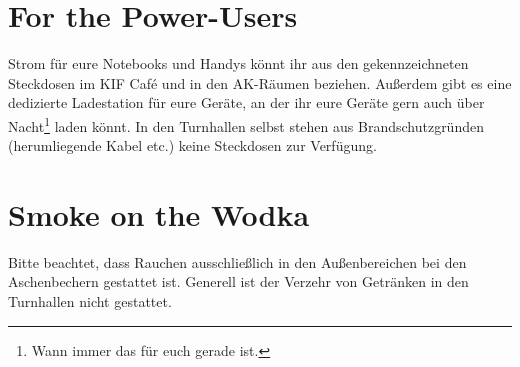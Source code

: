 \section*{For the Power-Users}

Strom für eure Notebooks und Handys könnt ihr aus den gekennzeichneten Steckdosen im KIF Café und in den AK-Räumen beziehen.
Außerdem gibt es eine dedizierte Ladestation für eure Geräte, an der ihr eure Geräte gern auch über Nacht\footnote{Wann immer das für euch gerade ist.} laden könnt.
In den Turnhallen selbst stehen aus Brandschutzgründen (herumliegende Kabel etc.) keine Steckdosen zur Verfügung.

\section*{Smoke on the Wodka}

Bitte beachtet, dass Rauchen ausschließlich in den Außenbereichen bei den Aschenbechern gestattet ist.
Generell ist der Verzehr von Getränken in den Turnhallen nicht gestattet.

